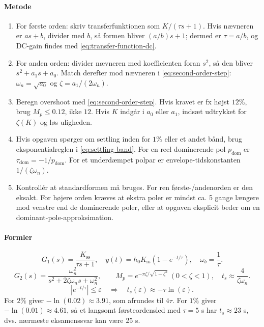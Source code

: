\paragraph{Metode}
\begin{enumerate}
\item For første orden: skriv transferfunktionen som \(K/(\tau s+1)\). Hvis nævneren
      er \(as+b\), divider med \(b\), så formen bliver \((a/b)s+1\); dermed er
      \(\tau=a/b\), og DC-gain findes med \eqref{eq:transfer-function-dc}.
\item For anden orden: divider nævneren med koefficienten foran \(s^2\), så den bliver
      \(s^2+a_1s+a_0\). Match derefter mod nævneren i \eqref{eq:second-order-step}:
      \(\omega_n=\sqrt{a_0}\) og \(\zeta=a_1/(2\omega_n)\).
\item Beregn overshoot med \eqref{eq:second-order-step}. Hvis kravet er fx højst
      \(12\%\), brug \(M_p\leq0.12\), ikke \(12\). Hvis \(K\) indgår i \(a_0\) eller
      \(a_1\), indsæt udtrykket for \(\zeta(K)\) og løs uligheden.
\item Hvis opgaven spørger om settling inden for \(1\%\) eller et andet bånd, brug
      eksponentialreglen i \eqref{eq:settling-band}. For en reel dominerende pol
      \(p_{\mathrm{dom}}\) er \(\tau_{\mathrm{dom}}=-1/p_{\mathrm{dom}}\). For et
      underdæmpet polpar er envelope-tidskonstanten \(1/(\zeta\omega_n)\).
\item Kontrollér at standardformen må bruges. For ren første-/andenorden er den eksakt.
      For højere orden kræves at ekstra poler er mindst ca. 5 gange længere mod venstre
      end de dominerende poler, eller at opgaven eksplicit beder om en
      dominant-pole-approksimation.
\end{enumerate}

\paragraph{Formler}
\begin{equation}
\label{eq:first-order-step}
G_1(s)=\frac{K_{\mathrm{ss}}}{\tau s+1},\quad
y(t)=h_0K_{\mathrm{ss}}(1-e^{-t/\tau}),\quad \omega_b=\frac1\tau .
\end{equation}
\begin{equation}
\label{eq:second-order-step}
G_2(s)=\frac{\omega_n^2}{s^2+2\zeta\omega_ns+\omega_n^2},\qquad
M_p=e^{-\pi\zeta/\sqrt{1-\zeta^2}}\ (0<\zeta<1),\quad
t_s\approx\frac4{\zeta\omega_n}.
\end{equation}
\begin{equation}
\label{eq:settling-band}
|e^{-t/\tau}|\leq \varepsilon
\quad\Rightarrow\quad
t_s(\varepsilon)\approx -\tau\ln(\varepsilon).
\end{equation}
For \(2\%\) giver \(-\ln(0.02)\approx3.91\), som afrundes til \(4\tau\). For \(1\%\)
giver \(-\ln(0.01)\approx4.61\), så et langsomt førsteordensled med
\(\tau=5\) s har \(t_s\approx23\) s, dvs. nærmeste eksamenssvar kan være 25 s.

